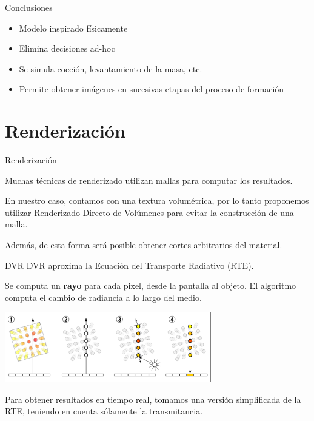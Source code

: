 \documentclass[spanish]{beamer}
\begin{document}
\begin{frame}{Conclusiones}
\begin{block}{}
\begin{itemize}
\item Modelo inspirado físicamente
\item Elimina decisiones ad-hoc
\item Se simula cocción, levantamiento de la masa, etc.
\item Permite obtener imágenes en sucesivas etapas del proceso de formación
\end{itemize}
\end{block}
\end{frame}

\section{Renderización}

\begin{frame}{Renderización}

Muchas técnicas de renderizado utilizan mallas para computar los resultados.

En nuestro caso, contamos con una textura volumétrica, por lo tanto proponemos utilizar Renderizado Directo de Volúmenes para evitar la construcción de una malla.

Además, de esta forma será posible obtener cortes arbitrarios del material.

\end{frame}

\begin{frame}{DVR}
DVR aproxima la Ecuación del Transporte Radiativo (RTE).

Se computa un \textbf{rayo} para cada pixel, desde la pantalla al objeto. El algoritmo computa el cambio de radiancia a lo largo del medio.


\centerline{\includegraphics[width=9cm]{../figures/dvr}}

Para obtener resultados en tiempo real, tomamos una versión simplificada de la RTE, teniendo en cuenta sólamente la transmitancia.
\end{frame}
\end{document}
